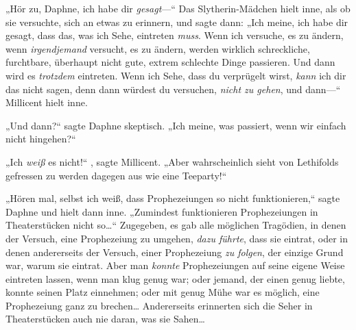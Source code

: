 „Hör zu, Daphne, ich habe dir \emph{gesagt}—“ Das Slytherin-Mädchen hielt inne, als ob sie versuchte, sich an etwas zu erinnern, und sagte dann: „Ich meine, ich habe dir gesagt, dass das, was ich Sehe, eintreten \emph{muss}. Wenn ich versuche, es zu ändern, wenn \emph{irgendjemand} versucht, es zu ändern, werden wirklich schreckliche, furchtbare, überhaupt nicht gute, extrem schlechte Dinge passieren. Und dann wird es \emph{trotzdem} eintreten. Wenn ich Sehe, dass du verprügelt wirst, \emph{kann} ich dir das nicht sagen, denn dann würdest du versuchen, \emph{nicht zu gehen}, und dann—“ Millicent hielt inne.

„Und dann?“ sagte Daphne skeptisch. „Ich meine, was passiert, wenn wir einfach nicht hingehen?“

„Ich \emph{weiß} es nicht!“ , sagte Millicent. „Aber wahrscheinlich sieht von Lethifolds gefressen zu werden dagegen aus wie eine Teeparty!“

„Hören mal, selbst ich weiß, dass Prophezeiungen so nicht funktionieren,“ sagte Daphne und hielt dann inne. „Zumindest funktionieren Prophezeiungen in Theaterstücken nicht so…“ Zugegeben, es gab alle möglichen Tragödien, in denen der Versuch, eine Prophezeiung zu umgehen, \emph{dazu führte}, dass sie eintrat, oder in denen andererseits der Versuch, einer Prophezeiung \emph{zu folgen}, der einzige Grund war, warum sie eintrat. Aber man \emph{konnte} Prophezeiungen auf seine eigene Weise eintreten lassen, wenn man klug genug war; oder jemand, der einen genug liebte, konnte seinen Platz einnehmen; oder mit genug Mühe war es möglich, eine Prophezeiung ganz zu brechen… Andererseits erinnerten sich die Seher in Theaterstücken auch nie daran, was sie Sahen…

